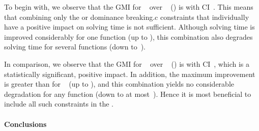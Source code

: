 To begin with, we observe that the \gls{GMI} for ~ over ~
() is \printGMI{%
  \SolvTechEnableOnlyGoodDomConsPrePlusSolvingTimeSpeedupPrePlusSolvingTimeRegularSpeedupGmean%
} with \gls{CI}~\printGMICI{%
  \SolvTechEnableOnlyGoodDomConsPrePlusSolvingTimeSpeedupPrePlusSolvingTimeRegularSpeedupCiMin%
}{%
  \SolvTechEnableOnlyGoodDomConsPrePlusSolvingTimeSpeedupPrePlusSolvingTimeRegularSpeedupCiMax%
}.
%
This means that combining only the  or
\gls{dominance breaking.c} \glspl{constraint} that individually have a positive
impact on solving time is not sufficient.
%
Although solving time is improved considerably for one \gls{function} (up to
\printZCNorm{%
  \SolvTechEnableOnlyGoodDomConsPrePlusSolvingTimeSpeedupPrePlusSolvingTimeZeroCenteredSpeedupMax%
}), this combination also degrades solving time for several \glspl{function}
(down
to~\printZCNorm{%
  \SolvTechEnableOnlyGoodDomConsPrePlusSolvingTimeSpeedupPrePlusSolvingTimeZeroCenteredSpeedupMin%
}).

In comparison, we observe that the \gls{GMI} for ~ over ~ ()
is \printGMI{%
  \SolvTechDisableAllDomConsPrePlusSolvingTimeSpeedupPrePlusSolvingTimeRegularSpeedupGmean%
} with \gls{CI}~\printGMICI{%
  \SolvTechDisableAllDomConsPrePlusSolvingTimeSpeedupPrePlusSolvingTimeRegularSpeedupCiMin%
}{%
  \SolvTechDisableAllDomConsPrePlusSolvingTimeSpeedupPrePlusSolvingTimeRegularSpeedupCiMax%
}, which is a statistically significant, positive impact.
%
In addition, the maximum improvement is greater than for ~ (up to
\printZCNorm{%
  \SolvTechDisableAllDomConsPrePlusSolvingTimeSpeedupPrePlusSolvingTimeZeroCenteredSpeedupMax%
}), and this combination yields no considerable degradation for any
\gls{function} (down to at
most~\printZCNorm{%
  \SolvTechDisableAllDomConsPrePlusSolvingTimeSpeedupPrePlusSolvingTimeZeroCenteredSpeedupMin%
}).
%
Hence it is most beneficial to include all such \glspl{constraint} in the
.


\paragraph{Conclusions}

